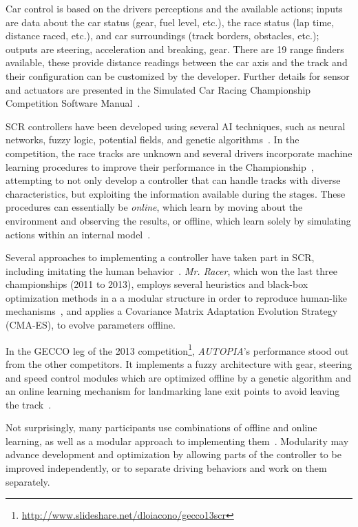 Car control is based on the drivers perceptions and the available actions; inputs are data about the car status (gear, fuel level, etc.), the race status (lap time, distance raced, etc.), and car surroundings (track borders, obstacles, etc.); outputs are steering, acceleration and breaking, gear. There are 19 range finders available, these provide distance readings between the car axis and the track and their configuration can be customized by the developer. Further details for sensor and actuators are presented in the Simulated Car Racing Championship
Competition Software Manual~\cite{SCR}.

SCR controllers have been developed using several AI techniques, such as neural networks, fuzzy logic, potential fields, and genetic algorithms~\cite{Loiacono:2012:LEA:2212908.2212953}. In the competition, the race tracks are unknown and several drivers incorporate machine learning procedures to improve their performance in the Championship~\cite{2009}, attempting to not only develop a controller that can handle tracks with diverse characteristics, but exploiting the information available during the stages. These procedures can essentially be \emph{online}, which learn by moving about the environment and observing the results, or offline, which learn solely by simulating actions within an internal model~\cite{mitchell_1997}.

Several approaches to implementing a controller have taken part in SCR, including imitating the human behavior~\cite{Exp,5593318}. \emph{Mr. Racer}, which won the last three championships (2011 to 2013), employs several heuristics and black-box optimization methods in a a modular structure in order to reproduce human-like mechanisms~\cite{MrRacer}, and applies a Covariance Matrix Adaptation Evolution Strategy (CMA-ES), to evolve parameters offline.

In the GECCO leg of the 2013 competition\footnote{\url{http://www.slideshare.net/dloiacono/gecco13scr}}, \emph{AUTOPIA}'s performance stood out from the other competitors. It implements a fuzzy architecture with gear, steering and speed control modules which are optimized offline by a genetic algorithm and an online learning mechanism for landmarking lane exit points to avoid leaving the track~\cite{AUTOPIA}.

Not surprisingly, many participants use combinations of offline and online learning, as well as a modular approach to implementing them~\cite{2009,DIEGO,Exp}. Modularity may advance development and optimization by allowing parts of the controller to be improved independently\cite{MrRacer,AUTOPIA2009}, or to separate driving behaviors and work on them separately.



